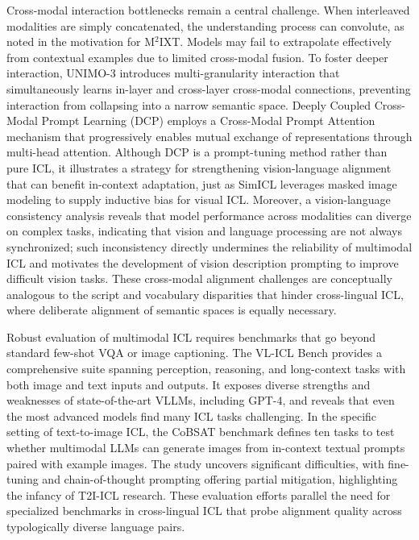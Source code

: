 \documentclass[11pt]{article}
\begin{document}
Cross-modal interaction bottlenecks remain a central challenge. When interleaved modalities are simply concatenated, the understanding process can convolute, as noted in the motivation for M\(^2\)IXT. Models may fail to extrapolate effectively from contextual examples due to limited cross-modal fusion. To foster deeper interaction, UNIMO-3 \cite{ref121} introduces multi-granularity interaction that simultaneously learns in-layer and cross-layer cross-modal connections, preventing interaction from collapsing into a narrow semantic space. Deeply Coupled Cross-Modal Prompt Learning (DCP) \cite{ref122} employs a Cross-Modal Prompt Attention mechanism that progressively enables mutual exchange of representations through multi-head attention. Although DCP is a prompt-tuning method rather than pure ICL, it illustrates a strategy for strengthening vision-language alignment that can benefit in-context adaptation, just as SimICL leverages masked image modeling to supply inductive bias for visual ICL. Moreover, a vision-language consistency analysis \cite{ref123} reveals that model performance across modalities can diverge on complex tasks, indicating that vision and language processing are not always synchronized; such inconsistency directly undermines the reliability of multimodal ICL and motivates the development of vision description prompting to improve difficult vision tasks. These cross-modal alignment challenges are conceptually analogous to the script and vocabulary disparities that hinder cross-lingual ICL, where deliberate alignment of semantic spaces is equally necessary.

Robust evaluation of multimodal ICL requires benchmarks that go beyond standard few-shot VQA or image captioning. The VL-ICL Bench \cite{ref124} provides a comprehensive suite spanning perception, reasoning, and long-context tasks with both image and text inputs and outputs. It exposes diverse strengths and weaknesses of state-of-the-art VLLMs, including GPT-4, and reveals that even the most advanced models find many ICL tasks challenging. In the specific setting of text-to-image ICL, the CoBSAT benchmark \cite{ref125} defines ten tasks to test whether multimodal LLMs can generate images from in-context textual prompts paired with example images. The study uncovers significant difficulties, with fine-tuning and chain-of-thought prompting offering partial mitigation, highlighting the infancy of T2I-ICL research. These evaluation efforts parallel the need for specialized benchmarks in cross-lingual ICL that probe alignment quality across typologically diverse language pairs.
\end{document}
